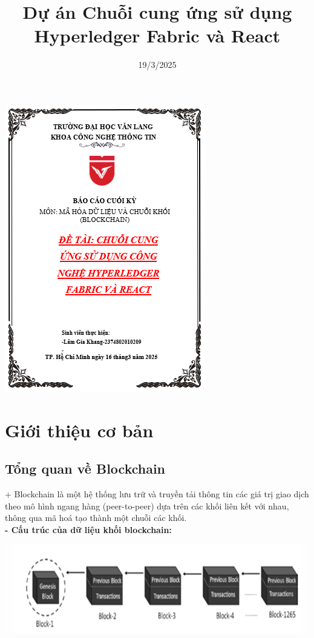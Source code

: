 \documentclass[a4paper,12pt]{article}
\title{\textbf{Dự án Chuỗi cung ứng sử dụng Hyperledger Fabric và React}}
\date{19/3/2025}
\begin{document}
\maketitle
\begin{center}
\includegraphics[scale=2]{Anh/A1.png}
\end{center}
{\color{red} \section{Giới thiệu cơ bản}}
{\color{red} \subsection{Tổng quan về Blockchain}}
+ Blockchain là một hệ thống lưu trữ và truyền tải thông tin các giá trị giao dịch theo mô hình ngang hàng (peer-to-peer) dựa trên các khối liên kết với nhau, thông qua mã hoá tạo thành một chuỗi các khối.\\
\textbf{- Cấu trúc của dữ liệu khối blockchain:}
\begin{center}
\includegraphics[scale=1.2]{Anh/A2.png}
\end{center}
\end{document}
